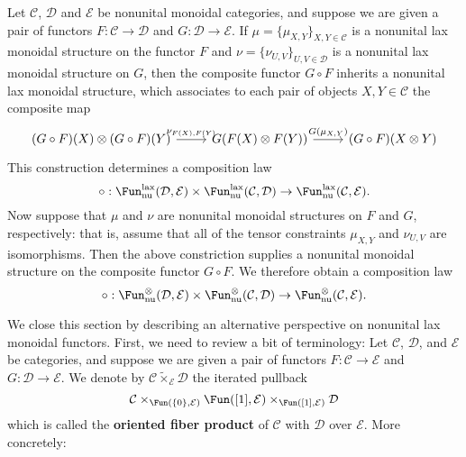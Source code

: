 \begin{example}\label{monoidal cat nonunital lax functor composition}
Let $\mathcal{C}$, $\mathcal{D}$ and $\mathcal{E}$ be nonunital monoidal categories, and suppose we are given a pair of functors $F:\mathcal{C}\to\mathcal{D}$ and $G:\mathcal{D}\to\mathcal{E}$. If $\mu=\{\mu_{X,Y}\}_{X,Y\in\mathcal{C}}$ is a nonunital lax monoidal structure on the functor $F$ and $\nu=\{\nu_{U,V}\}_{U,V\in\mathcal{D}}$ is a nonunital lax monoidal structure on $G$, then the composite functor $G\circ F$ inherits a nonunital lax monoidal structure, which associates to each pair of objects $X,Y\in\mathcal{C}$ the composite map
\[\begin{tikzcd}
(G\circ F)(X)\otimes(G\circ F)(Y)\ar[r,"\nu_{F(X),F(Y)}"]&G(F(X)\otimes F(Y))\ar[r,"G(\mu_{X,Y})"]&(G\circ F)(X\otimes Y)
\end{tikzcd}\]
This construction determines a composition law
\[\circ:\Fun^{\mathrm{lax}}_{\mathrm{nu}}(\mathcal{D},\mathcal{E})\times\Fun^{\mathrm{lax}}_{\mathrm{nu}}(\mathcal{C},\mathcal{D})\to\Fun^{\mathrm{lax}}_{\mathrm{nu}}(\mathcal{C},\mathcal{E}).\]
Now suppose that $\mu$ and $\nu$ are nonunital monoidal structures on $F$ and $G$, respectively: that is, assume that all of the tensor constraints $\mu_{X,Y}$ and $\nu_{U,V}$ are isomorphisms. Then the above constriction supplies a nonunital monoidal structure on the composite functor $G\circ F$. We therefore obtain a composition law
\[\circ:\Fun^{\otimes}_{\mathrm{nu}}(\mathcal{D},\mathcal{E})\times\Fun^{\otimes}_{\mathrm{nu}}(\mathcal{C},\mathcal{D})\to\Fun^{\otimes}_{\mathrm{nu}}(\mathcal{C},\mathcal{E}).\]
\end{example}
We close this section by describing an alternative perspective on nonunital lax monoidal functors. First, we need to review a bit of terminology: Let $\mathcal{C}$, $\mathcal{D}$, and $\mathcal{E}$ be categories, and suppose we are given a pair of functors $F:\mathcal{C}\to\mathcal{E}$ and $G:\mathcal{D}\to\mathcal{E}$. We denote by $\mathcal{C}\tilde{\times}_{\mathcal{E}}\mathcal{D}$ the iterated pullback
\[\mathcal{C}\times_{\Fun(\{0\},\mathcal{E})}\Fun([1],\mathcal{E})\times_{\Fun([1],\mathcal{E})}\mathcal{D}\]
which is called the \textbf{oriented fiber product} of $\mathcal{C}$ with $\mathcal{D}$ over $\mathcal{E}$. More concretely:
